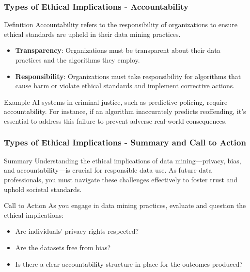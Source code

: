 \documentclass[aspectratio=169]{beamer}
\begin{document}
\begin{frame}[fragile]
    \frametitle{Types of Ethical Implications - Accountability}
    \begin{block}{Definition}
        Accountability refers to the responsibility of organizations to ensure ethical standards are upheld in their data mining practices.
    \end{block}
    
    \begin{itemize}
        \item \textbf{Transparency}: Organizations must be transparent about their data practices and the algorithms they employ.
        \item \textbf{Responsibility}: Organizations must take responsibility for algorithms that cause harm or violate ethical standards and implement corrective actions.
    \end{itemize}

    \begin{exampleblock}{Example}
        AI systems in criminal justice, such as predictive policing, require accountability. For instance, if an algorithm inaccurately predicts reoffending, it's essential to address this failure to prevent adverse real-world consequences.
    \end{exampleblock}
\end{frame}

\begin{frame}[fragile]
    \frametitle{Types of Ethical Implications - Summary and Call to Action}
    \begin{block}{Summary}
        Understanding the ethical implications of data mining—privacy, bias, and accountability—is crucial for responsible data use. As future data professionals, you must navigate these challenges effectively to foster trust and uphold societal standards.
    \end{block}
    
    \begin{block}{Call to Action}
        As you engage in data mining practices, evaluate and question the ethical implications:
        \begin{itemize}
            \item Are individuals’ privacy rights respected?
            \item Are the datasets free from bias?
            \item Is there a clear accountability structure in place for the outcomes produced?
        \end{itemize}
    \end{block}
\end{frame}
\end{document}
